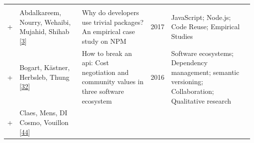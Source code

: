 \documentclass[]{book}
\begin{document}
\begin{longtable}[]{@{}lllll@{}}
\begin{minipage}[t]{0.39\columnwidth}
\strut
\end{minipage}\tabularnewline
\begin{minipage}[t]{0.01\columnwidth}\raggedright\strut
+\strut
\end{minipage} & \begin{minipage}[t]{0.09\columnwidth}\raggedright\strut
Abdalkareem, Nourry, Wehaibi, Mujahid, Shihab
{[}\protect\hyperlink{ref-Abdalkareem2017}{3}{]}\strut
\end{minipage} & \begin{minipage}[t]{0.34\columnwidth}\raggedright\strut
Why do developers use trivial packages? An empirical case study on
NPM\strut
\end{minipage} & \begin{minipage}[t]{0.02\columnwidth}\raggedright\strut
2017\strut
\end{minipage} & \begin{minipage}[t]{0.39\columnwidth}\raggedright\strut
JavaScript; Node.js; Code Reuse; Empirical Studies\strut
\end{minipage}\tabularnewline
\begin{minipage}[t]{0.01\columnwidth}\raggedright\strut
+\strut
\end{minipage} & \begin{minipage}[t]{0.09\columnwidth}\raggedright\strut
Bogart, Kästner, Herbsleb, Thung
{[}\protect\hyperlink{ref-Bogart2016}{32}{]}\strut
\end{minipage} & \begin{minipage}[t]{0.34\columnwidth}\raggedright\strut
How to break an api: Cost negotiation and community values in three
software ecosystem\strut
\end{minipage} & \begin{minipage}[t]{0.02\columnwidth}\raggedright\strut
2016\strut
\end{minipage} & \begin{minipage}[t]{0.39\columnwidth}\raggedright\strut
Software ecosystems; Dependency management; semantic versioning;
Collaboration; Qualitative research\strut
\end{minipage}\tabularnewline
\begin{minipage}[t]{0.01\columnwidth}\raggedright\strut
+\strut
\end{minipage} & \begin{minipage}[t]{0.09\columnwidth}\raggedright\strut
Claes, Mens, DI Cosmo, Vouillon
{[}\protect\hyperlink{ref-Claes2015}{44}{]}\strut
\end{minipage} & \begin{minipage}[t]{0.34\columnwidth}\raggedright\strut

\end{minipage}
\end{longtable}
\end{document}

